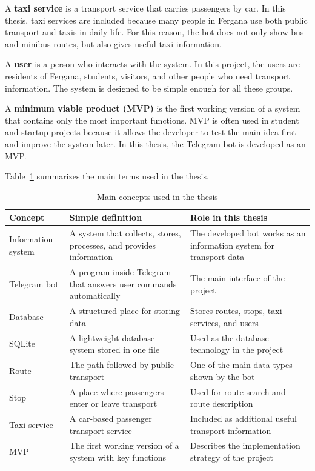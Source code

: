 A \textbf{taxi service} is a transport service that carries passengers by car. In this thesis, taxi services are included because many people in Fergana use both public transport and taxis in daily life. For this reason, the bot does not only show bus and minibus routes, but also gives useful taxi information.

A \textbf{user} is a person who interacts with the system. In this project, the users are residents of Fergana, students, visitors, and other people who need transport information. The system is designed to be simple enough for all these groups.

A \textbf{minimum viable product (MVP)} is the first working version of a system that contains only the most important functions. MVP is often used in student and startup projects because it allows the developer to test the main idea first and improve the system later. In this thesis, the Telegram bot is developed as an MVP. \cite{sommerville2016software}

Table~\ref{tab:core_concepts} summarizes the main terms used in the thesis.

\begin{table}[H]
\centering
\caption{Main concepts used in the thesis}
\label{tab:core_concepts}
\begin{tabular}{|p{4cm}|p{5cm}|p{5cm}|}
\hline
\textbf{Concept} & \textbf{Simple definition} & \textbf{Role in this thesis} \\
\hline
Information system & A system that collects, stores, processes, and provides information & The developed bot works as an information system for transport data \\
\hline
Telegram bot & A program inside Telegram that answers user commands automatically & The main interface of the project \\
\hline
Database & A structured place for storing data & Stores routes, stops, taxi services, and users \\
\hline
SQLite & A lightweight database system stored in one file & Used as the database technology in the project \\
\hline
Route & The path followed by public transport & One of the main data types shown by the bot \\
\hline
Stop & A place where passengers enter or leave transport & Used for route search and route description \\
\hline
Taxi service & A car-based passenger transport service & Included as additional useful transport information \\
\hline
MVP & The first working version of a system with key functions & Describes the implementation strategy of the project \\
\hline
\end{tabular}
\end{table}

